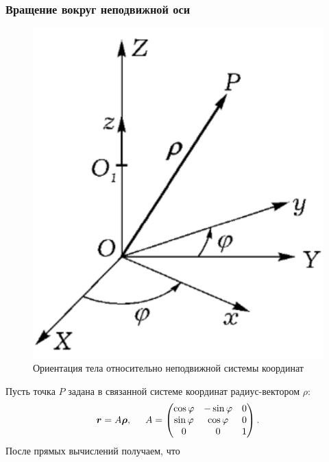 \subsubsection*{Вращение вокруг неподвижной оси}
\begin{figure}
  \begin{center}
        \vspace{-10 mm}
        \includegraphics[width=0.9\linewidth]{img/stable_axis.png}
  \end{center}
    \caption{Ориентация тела относительно неподвижной системы координат}
\end{figure}
Пусть точка $P$ задана в связанной системе координат радиус-вектором $\rho$:
\begin{equation*}
    \mbox{\boldmath $r$} = A \mbox{\boldmath $\rho$},
    \hspace*{0.5 cm}
    A = \begin{pmatrix}
            \cos \varphi & - \sin \varphi & 0 \\
            \sin \varphi & \cos \varphi & 0 \\
            0 & 0 & 1
        \end{pmatrix}.
\end{equation*}
После прямых вычислений получаем, что
